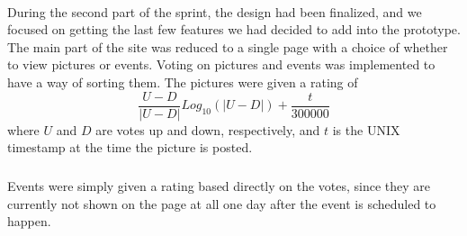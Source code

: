\paragraph{} During the second part of the sprint, the design had been finalized, and we focused on getting the last few features we had decided to add into the prototype. The main part of the site was reduced to a single page with a choice of whether to view pictures or events. Voting on pictures and events was implemented to have a way of sorting them. The pictures were given a rating of
\begin{equation} \label{eq:S5DesignImplSorting}
\frac{U-D}{|U-D|} Log_{10}(|U-D|) + \frac{t}{300000}
\end{equation}
where $U$ and $D$ are votes up and down, respectively, and $t$ is the UNIX timestamp at the time the picture is posted.
\subparagraph{} Events were simply given a rating based directly on the votes, since they are currently not shown on the page at all one day after the event is scheduled to happen.


